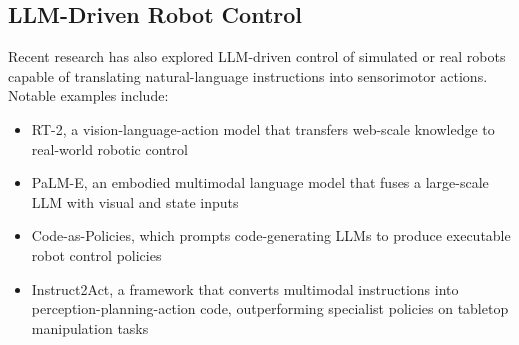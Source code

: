 \documentclass[../report.tex]{subfiles}
\begin{document}
\subsection{LLM-Driven Robot Control}
Recent research has also explored LLM-driven control of simulated or real robots capable of translating natural-language instructions into sensorimotor actions. Notable examples include:
\begin{itemize}
	\item RT-2, a vision-language-action model that transfers web-scale knowledge to real-world robotic control \cite{rt2}
	\item PaLM-E, an embodied multimodal language model that fuses a large-scale LLM with visual and state inputs \cite{palme}
	\item Code-as-Policies, which prompts code-generating LLMs to produce executable robot control policies \cite{codeaspolicies}
	\item Instruct2Act, a framework that converts multimodal instructions into perception-planning-action code, outperforming specialist policies on tabletop manipulation tasks \cite{instruct2act}
\end{itemize}
\end{document}
